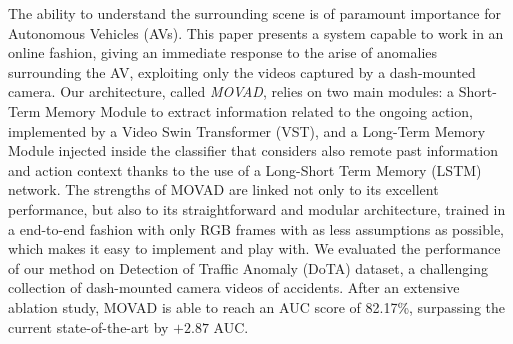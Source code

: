 The ability to understand the surrounding scene is of paramount importance for Autonomous Vehicles (AVs).
This paper presents a system capable to work in an online fashion, giving an immediate response to the arise of anomalies surrounding the AV, exploiting only the videos captured by a dash-mounted camera.
Our architecture, called \emph{MOVAD}, relies on two main modules: a Short-Term Memory Module to extract information related to the ongoing action, implemented by a Video Swin Transformer (VST), and a Long-Term Memory Module injected inside the classifier that considers also remote past information and action context thanks to the use of a Long-Short Term Memory (LSTM) network. 
The strengths of MOVAD are linked not only to its excellent performance, but also to its straightforward and modular architecture, trained in a end-to-end fashion with only RGB frames with as less assumptions as possible, which makes it easy to implement and play with.
We evaluated the performance of our method on Detection of Traffic Anomaly (DoTA) dataset, a challenging collection of dash-mounted camera videos of accidents.
After an extensive ablation study, MOVAD is able to reach an AUC score of 82.17\%, surpassing the current state-of-the-art by $+2.87$ AUC.